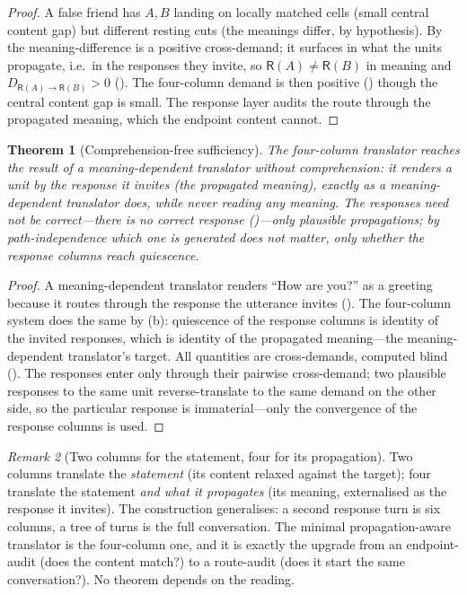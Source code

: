 \documentclass[twocolumn,11pt,a4paper]{article}
\theoremstyle{sup}
\newtheorem{theorem}{Theorem}[section]
\theoremstyle{definition}
\theoremstyle{remark}
\newtheorem{remark}[theorem]{Remark}
\newcommand{\dem}{D}
\newcommand{\colA}{A}
\newcommand{\colB}{B}
\newcommand{\Resp}{\mathsf{R}}
\begin{document}
\begin{proof}
A false friend has $\colA,\colB$ landing on locally matched cells (small central
content gap) but different resting cuts (the meanings differ, by hypothesis). By
 the meaning-difference is a positive cross-demand; it
surfaces in what the units propagate, i.e.\ in the responses they invite, so
$\Resp(\colA)\neq\Resp(\colB)$ in meaning and
$\dem_{\Resp(\colA)\to\Resp(\colB)}>0$ (). The four-column
demand is then positive () though the central content gap is
small. The response layer audits the route through the propagated meaning, which
the endpoint content cannot.
\end{proof}

\begin{theorem}[Comprehension-free sufficiency]
\label{thm:compfree}
The four-column translator reaches the result of a meaning-dependent translator
without comprehension: it renders a unit by the response it invites (the
propagated meaning), exactly as a meaning-dependent translator does, while never
reading any meaning. The responses need not be correct---there is no correct
response ()---only plausible propagations; by path-independence
which one is generated does not matter, only whether the response columns reach
quiescence.
\end{theorem}

\begin{proof}
A meaning-dependent translator renders ``How are you?'' as a greeting because it
routes through the response the utterance invites (). The
four-column system does the same by (b): quiescence of the
response columns is identity of the invited responses, which is identity of the
propagated meaning---the meaning-dependent translator's target. All quantities
are cross-demands, computed blind (). The responses enter
only through their pairwise cross-demand; two plausible responses to the same
unit reverse-translate to the same demand on the other side, so the particular
response is immaterial---only the convergence of the response columns is used.
\end{proof}

\begin{remark}[Two columns for the statement, four for its propagation]
\label{rem:fourgen}
Two columns translate the \emph{statement} (its content relaxed against the
target); four translate the statement \emph{and what it propagates} (its meaning,
externalised as the response it invites). The construction generalises: a second
response turn is six columns, a tree of turns is the full conversation. The
minimal propagation-aware translator is the four-column one, and it is exactly
the upgrade from an endpoint-audit (does the content match?) to a route-audit
(does it start the same conversation?). No theorem depends on the reading.
\end{remark}
\end{document}
